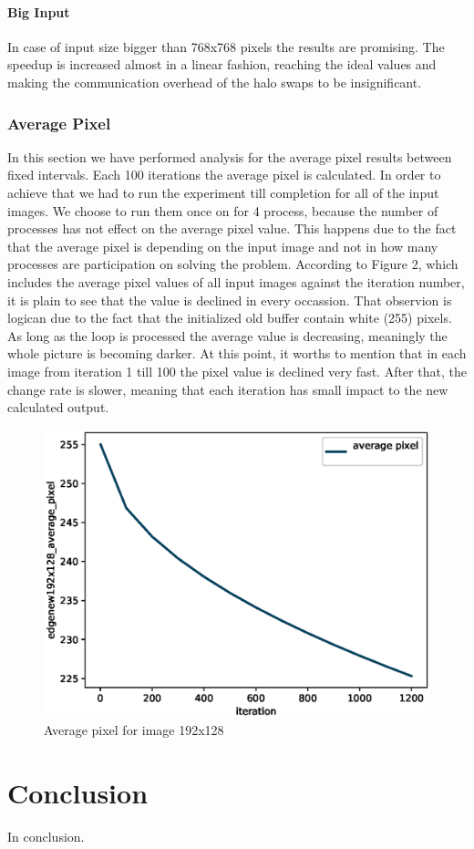 \documentclass[12pt,a4paper]{article}
\newcommand{\sectionVspacing}{\vspace{15pt}}
\begin{document}
            \paragraph{Big Input}
                In case of input size bigger than 768x768 pixels the results are promising. The speedup is increased almost in a linear fashion, reaching the ideal values and making the communication overhead of the halo swaps to be insignificant. 

        \subsubsection{Average Pixel}
            In this section we have performed analysis for the average pixel results between fixed intervals. Each 100 iterations the average pixel is calculated. In order to achieve that we had to run the experiment till completion for all of the input images. We choose to run them once on for 4 process, because the number of processes has not effect on the average pixel value. This happens due to the fact that the average pixel is depending on the input image and not in how many processes are participation on solving the problem. According to Figure 2, which includes the average pixel values of all input images against the iteration number, it is plain to see that the value is declined in every occassion. That observion is logican due to the fact that the initialized old buffer contain white (255) pixels. As long as the loop is processed the average value is decreasing, meaningly the whole picture is becoming darker. At this point, it worths to mention that in each image from iteration 1 till 100 the pixel value is declined very fast. After that, the change rate is slower, meaning that each iteration has small impact to the new calculated output.

            \begin{figure}[ht]
                \centering
                \includegraphics[scale=0.6]{../graphs/edgenew192x128_average_pixel.eps}
                \caption{Average pixel for image 192x128}
                \label{speedup-192x128}
            \end{figure}

\sectionVspacing

\section{Conclusion}
In conclusion.
\end{document}

